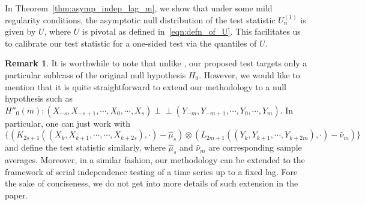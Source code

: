 \documentclass[11pt]{article}
\newcommand{\indep}{\perp \!\!\! \perp}
\theoremstyle{plain}
\theoremstyle{definition}
\newtheorem{remark}{Remark}
\theoremstyle{remark}
\begin{document}
In Theorem~\ref{thm:asymp_indep_lag_m}, we show that under some mild regularity conditions, the asymptotic null distribution of the test statistic $U^{(1)}_n$ is given by $U$, where $U$ is pivotal as defined in~\eqref{eqn:defn_of_U}. This facilitates us to calibrate our test statistic for a one-sided test via the quantiles of $U.$
\begin{remark}
    It is worthwhile to note that unlike \cite{betken2021bootstrap}, our proposed test targets only a particular sublcass of the original null hypothesis $H_0$. However, we would like to mention that it is quite straightforward to extend our methodology to a null hypothesis such as
    $H''_0(m) : (X_{-s},X_{-s+1}, \cdots ,X_0, \cdots ,X_s) \indep (Y_{-m}, Y_{-m+1}, \cdots , Y_0, \cdots , Y_m)$. In particular, one can just work with 
    $$\{(K_{2s+1}((X_{k},X_{k+1}, \cdots , \cdots ,X_{k+2s}),\cdot)-\hat{\mu}_s)\otimes (L_{2m+1}((Y_{k}, Y_{k+1}, \cdots , Y_{k+2m}),\cdot)-\hat{\nu}_m)\}$$ and define the test statistic similarly, where $\hat{\mu}_s$ and $\hat{\nu}_m$ are corresponding sample averages. Moreover, in a similar fashion, our methodology can be extended to the framework of serial independence testing of a time series up to a fixed lag. Fore the sake of conciseness, we do not get into more details of such extension in the paper.
\end{remark}
\end{document}
